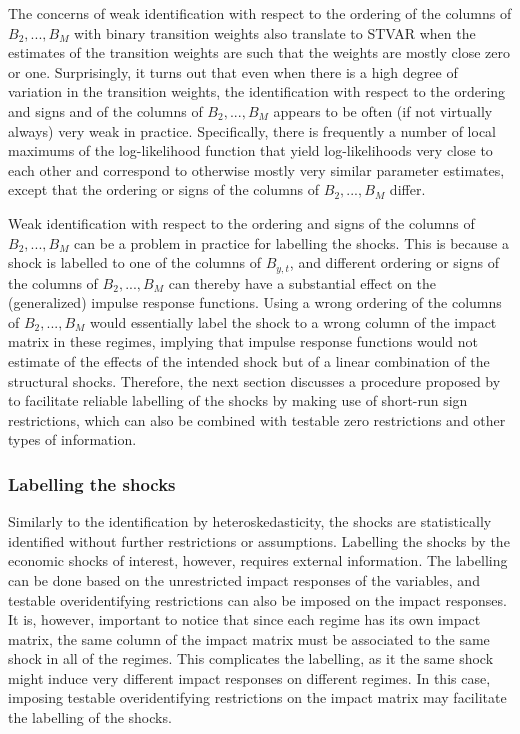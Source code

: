 \documentclass[nojss]{jss}
\begin{document}
The concerns of weak identification with respect to the ordering of the columns of $B_2,...,B_M$ with binary transition weights also translate to STVAR when the estimates of the transition weights are such that the weights are mostly close zero or one. Surprisingly, it turns out that even when there is a high degree of variation in the transition weights, the identification with respect to the ordering and signs and of the columns of $B_2,...,B_M$ appears to be often (if not virtually always) very weak in practice. Specifically, there is frequently a number of local maximums of the log-likelihood function that yield log-likelihoods very close to each other and correspond to otherwise mostly very similar parameter estimates, except that the ordering or signs of the columns of $B_2,...,B_M$ differ.

Weak identification with respect to the ordering and signs of the columns of $B_2,...,B_M$ can be a problem in practice for labelling the shocks. This is because a shock is labelled to one of the columns of $B_{y,t}$, and different ordering or signs of the columns of $B_2,...,B_M$ can thereby have a substantial effect on the (generalized) impulse response functions. Using a wrong ordering of the columns of $B_2,...,B_M$ would essentially label the shock to a wrong column of the impact matrix in these regimes, implying that impulse response functions would not estimate of the effects of the intended shock but of a linear combination of the structural shocks. Therefore, the next section discusses a procedure proposed by \cite{Virolainen2:2024} to facilitate reliable labelling of the shocks by making use of short-run sign restrictions, which can also be combined with testable zero restrictions and other types of information.

\subsubsection{Labelling the shocks}

Similarly to the identification by heteroskedasticity, the shocks are statistically identified without further restrictions or assumptions. Labelling the shocks by the economic shocks of interest, however, requires external information. The labelling can be done based on the unrestricted impact responses of the variables, and testable overidentifying restrictions can also be imposed on the impact responses. It is, however, important to notice that since each regime has its own impact matrix, the same column of the impact matrix must be associated to the same shock in all of the regimes. This complicates the labelling, as it the same shock might induce very different impact responses on different regimes. In this case, imposing testable overidentifying restrictions on the impact matrix may facilitate the labelling of the shocks.
\end{document}
